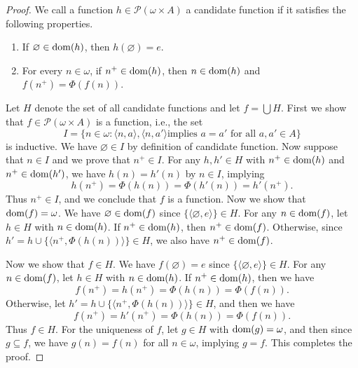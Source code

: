 \begin{proof}
  We call a function $h \in \mathcal{P}(\omega \times A)$ a candidate function
  if it satisfies the following properties.
  \begin{enumerate}[1.]
    \item If $\varnothing \in \operatorname{dom}(h)$, then $h(\varnothing) = e$.
    \item For every $n \in \omega$, if $n^+ \in \operatorname{dom}(h)$, then $n \in \operatorname{dom}(h)$
    and $f(n^+) = \Phi(f(n))$.
  \end{enumerate}
  Let $H$ denote the set of all candidate functions and let $f = \bigcup H$.
  First we show that $f \in \mathcal{P}(\omega \times A)$ is a function,
  i.e., the set
  \begin{equation*}
    I = \{n \in \omega: \text{$\langle n, a \rangle, \langle n, a' \rangle$
    implies $a = a'$ for all $a, a' \in A$}\}
  \end{equation*}
  is inductive.
  We have $\varnothing \in I$ by definition of candidate function.
  Now suppose that $n \in I$ and we prove that $n^+ \in I$.
  For any $h, h' \in H$ with $n^+ \in \operatorname{dom}(h)$ and $n^+ \in \operatorname{dom}(h')$, we have
  $h(n) = h'(n)$ by $n \in I$, implying
  \begin{equation*}
    h(n^+) = \Phi(h(n)) = \Phi(h'(n)) = h'(n^+).
  \end{equation*}
  Thus $n^+ \in I$, and we conclude that $f$ is a function.
  Now we show that $\operatorname{dom}(f) = \omega$.
  We have $\varnothing \in \operatorname{dom}(f)$ since $\{\langle \varnothing, e \rangle\}
  \in H$.
  For any $n \in \operatorname{dom}(f)$, let $h \in H$ with $n \in \operatorname{dom}(h)$.
  If $n^+ \in \operatorname{dom}(h)$, then $n^+ \in \operatorname{dom}(f)$.
  Otherwise, since $h' = h \cup \{\langle n^+, \Phi(h(n)) \rangle\} \in H$, we
  also have $n^+ \in \operatorname{dom}(f)$.

  Now we show that $f \in H$.
  We have $f(\varnothing) = e$ since
  $\{\langle \varnothing, e \rangle\} \in H$.
  For any $n \in \operatorname{dom}(f)$, let $h \in H$ with $n \in \operatorname{dom}(h)$.
  If $n^+ \in \operatorname{dom}(h)$, then we have
  \begin{equation*}
    f(n^+) = h(n^+) = \Phi(h(n)) = \Phi(f(n)).
  \end{equation*}
  Otherwise, let $h' = h \cup \{\langle n^+, \Phi(h(n)) \rangle\} \in H$, and
  then we have
  \begin{equation*}
    f(n^+) = h'(n^+) = \Phi(h(n)) = \Phi(f(n)).
  \end{equation*}
  Thus $f \in H$.
  For the uniqueness of $f$, let $g \in H$ with $\operatorname{dom}(g) = \omega$, and then
  since $g \subseteq f$, we have $g(n) = f(n)$ for all $n \in \omega$, implying
  $g = f$.
  This completes the proof.
\end{proof}

